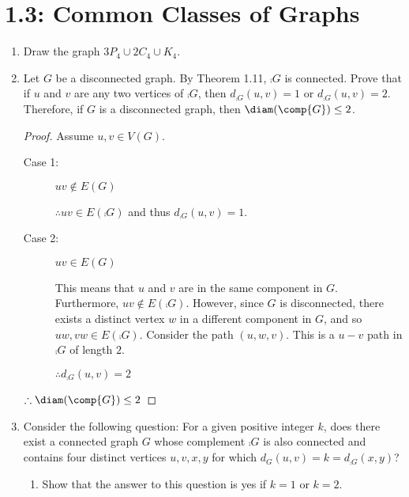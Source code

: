 \documentclass[letterpaper,12pt,fleqn]{article}
\begin{document}
\section*{1.3: Common Classes of Graphs}

\begin{enumerate}[start=21]
\item Draw the graph \(3P_4\cup2C_4\cup K_4\).


  \bigskip

\item Let \(G\) be a disconnected graph.  By Theorem 1.11, \(\comp{G}\) is connected.  Prove that if \(u\) and \(v\)
  are any two vertices of \(\comp{G}\), then \(d_{\comp{G}}(u,v)=1\) or \(d_{\comp{G}}(u,v)=2\).  Therefore, if \(G\)
  is a disconnected graph, then \(\diam(\comp{G})\le2\).

  \begin{proof}
    Assume \(u,v\in V(G)\).

    \begin{description}
    \item[Case 1:] \(uv\notin E(G)\)

      \(\therefore uv\in E(\comp{G})\) and thus \(d_{\comp{G}}(u,v)=1\).
      
    \item[Case 2:] \(uv\in E(G)\)

      This means that \(u\) and \(v\) are in the same component in \(G\).  Furthermore, \(uv\notin E(\comp{G})\).
      However, since \(G\) is disconnected, there exists a distinct vertex \(w\) in a different component in \(G\),
      and so \(uw,vw\in E(\comp{G})\).  Consider the path \((u,w,v)\).  This is a \(u-v\) path in \(\comp{G}\) of
      length \(2\).

      \(\therefore d_{\comp{G}}(u,v)=2\)
    \end{description}

    \(\therefore\diam(\comp{G})\le2\)
  \end{proof}

\item Consider the following question: For a given positive integer \(k\), does there exist a connected graph \(G\)
  whose complement \(\comp{G}\) is also connected and contains four distinct vertices \(u,v,x,y\) for which
  \(d_G(u,v)=k=d_{\comp{G}}(x,y)\)?
  \begin{enumerate}
  \item Show that the answer to this question is yes if \(k=1\) or \(k=2\).


\end{enumerate}
\end{enumerate}
\end{document}
